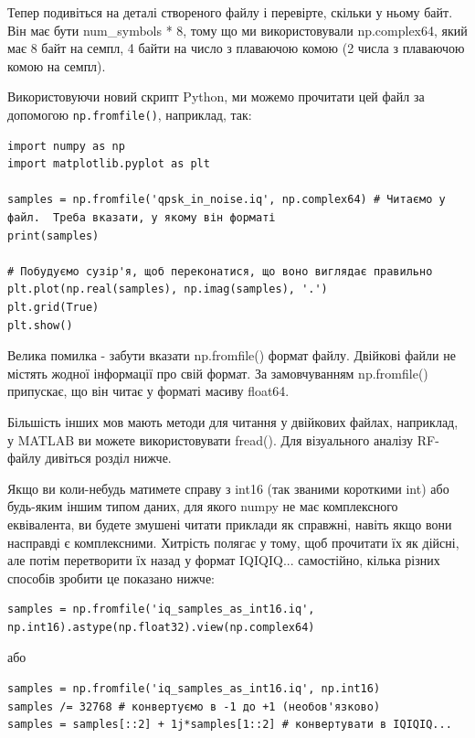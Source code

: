 Тепер подивіться на деталі створеного файлу і перевірте, скільки у ньому
байт. Він має бути num\_symbols * 8, тому що ми використовували
np.complex64, який має 8 байт на семпл, 4 байти на число з плаваючою
комою (2 числа з плаваючою комою на семпл).

Використовуючи новий скрипт Python, ми можемо прочитати цей файл за
допомогою \texttt{np.fromfile()}, наприклад, так:

\begin{Verbatim}[breaklines=true,breakanywhere=true,fontsize=\small]
import numpy as np
import matplotlib.pyplot as plt

samples = np.fromfile('qpsk_in_noise.iq', np.complex64) # Читаємо у файл.  Треба вказати, у якому він форматі
print(samples)

# Побудуємо сузір'я, щоб переконатися, що воно виглядає правильно
plt.plot(np.real(samples), np.imag(samples), '.')
plt.grid(True)
plt.show()
\end{Verbatim}

Велика помилка - забути вказати np.fromfile() формат файлу. Двійкові
файли не містять жодної інформації про свій формат. За замовчуванням
np.fromfile() припускає, що він читає у форматі масиву float64.

Більшість інших мов мають методи для читання у двійкових файлах,
наприклад, у MATLAB ви можете використовувати fread(). Для візуального
аналізу RF-файлу дивіться розділ нижче.

Якщо ви коли-небудь матимете справу з int16 (так званими короткими int)
або будь-яким іншим типом даних, для якого numpy не має комплексного
еквівалента, ви будете змушені читати приклади як справжні, навіть якщо
вони насправді є комплексними. Хитрість полягає у тому, щоб прочитати їх
як дійсні, але потім перетворити їх назад у формат IQIQIQ... самостійно,
кілька різних способів зробити це показано нижче:

\begin{Verbatim}[breaklines=true,breakanywhere=true,fontsize=\small]
samples = np.fromfile('iq_samples_as_int16.iq', np.int16).astype(np.float32).view(np.complex64)
\end{Verbatim}

або

\begin{Verbatim}[breaklines=true,breakanywhere=true,fontsize=\small]
samples = np.fromfile('iq_samples_as_int16.iq', np.int16)
samples /= 32768 # конвертуємо в -1 до +1 (необов'язково)
samples = samples[::2] + 1j*samples[1::2] # конвертувати в IQIQIQ...
\end{Verbatim}

